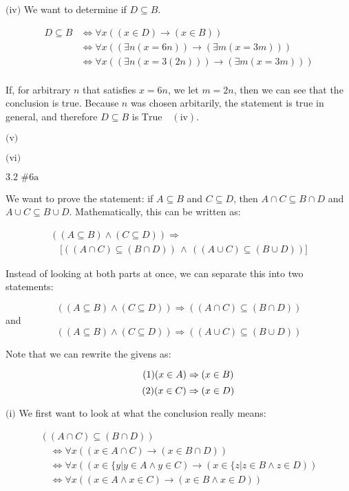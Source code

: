 \documentclass{article}
\newcommand{\T}{\text{True}}
\newcommand{\problem}[2]{$\boxed{\text{#1 \##2}}$}
\newcommand{\subproblem}[1]{$\boxed{\text{(#1)}}$}
\newcommand{\subsolution}[2]{\boxed{#2\quad(\text{#1})}}
\newcommand{\multistep}[1]{\begin{array}{rl} #1 \end{array}}
\newcommand{\subeq}{\subseteq}
\begin{document}
\begin{multicols*}{2}
%
\subproblem{iv} We want to determine if $D\subeq{}B$.

\[
\multistep{
D\subeq B&\Leftrightarrow \forall x((x\in D)\rightarrow(x\in B)) \\
&\Leftrightarrow \forall x((\exists n(x=6n))\rightarrow(\exists m(x=3m))) \\
&\Leftrightarrow \forall x((\exists n(x=3(2n)))\rightarrow(\exists m(x=3m))) \\
}
\]

If, for arbitrary $n$ that satisfies $x=6n$, we let $m=2n$, then we
can see that the conclusion is true. Because $n$ was chosen
arbitarily, the statement is true in general, and therefore
$D\subeq{}B$ is $\subsolution{iv}{\T}$.

%
\subproblem{v}

%
\subproblem{vi}

%
\problem{3.2}{6a}

We want to prove the statement: if $A\subeq{}B$ and $C\subeq{}D$, then
$A\cap{}C\subeq{}B\cap{}D$ and
$A\cup{}C\subeq{}B\cup{}D$. Mathematically, this can be written as:

\[
\begin{array}{l}
((A\subeq B)\wedge(C\subeq D))\Rightarrow \\
\quad \lbrack((A\cap C)\subeq(B\cap D))\,\wedge\,((A\cup C)\subeq(B\cup D))\rbrack
\end{array}
\]

Instead of looking at both parts at once, we can separate this into
two statements:

\[\tag{i}
((A\subeq B)\wedge(C\subeq D))\Rightarrow ((A\cap C)\subeq(B\cap D))
\] and \[\tag{ii}
((A\subeq B)\wedge(C\subeq D))\Rightarrow ((A\cup C)\subeq(B\cup D))
\]

Note that we can rewrite the givens as:

\[\tag{1}
(x\in A)\Rightarrow(x\in B) \\
\] \[\tag{2}
(x\in C)\Rightarrow(x\in D) \\
\]

%
\subproblem{i} We first want to look at what the conclusion really
means:

\[
\begin{array}{l}
((A\cap C)\subeq(B\cap D)) \\
\quad\Leftrightarrow \forall x((x\in A\cap C)\rightarrow(x\in B\cap D)) \\
\quad\Leftrightarrow \forall x((x\in\{y|y\in A\wedge y\in C)\rightarrow(x\in\{z|z\in B\wedge z\in D)) \\
\quad\Leftrightarrow \forall x((x\in A\wedge x\in C)\rightarrow(x\in B\wedge x\in D)) \\
\end{array}
\]


\end{multicols*}
\end{document}
